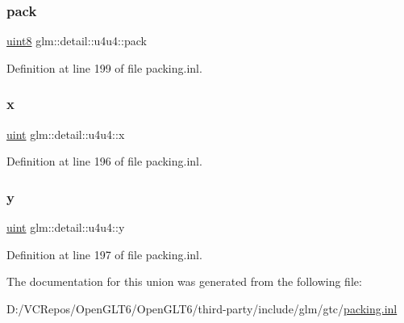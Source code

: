 \mbox{\label{unionglm_1_1detail_1_1u4u4_a823a2e3d7ae6e4710c0ceb40e191ef7b}} 
\subsubsection{\texorpdfstring{pack}{pack}}
{\footnotesize\ttfamily \mbox{\hyperlink{namespaceglm_1_1detail_aef2588f97d090cc19fbbe0c74fe17c8f}{uint8}} glm\+::detail\+::u4u4\+::pack}



Definition at line 199 of file packing.\+inl.

\mbox{\label{unionglm_1_1detail_1_1u4u4_a488b94e524db2319dd7801ef632ef7f1}} 
\subsubsection{\texorpdfstring{x}{x}}
{\footnotesize\ttfamily \mbox{\hyperlink{group__core__precision_ga4fd29415871152bfb5abd588334147c8}{uint}} glm\+::detail\+::u4u4\+::x}



Definition at line 196 of file packing.\+inl.

\mbox{\label{unionglm_1_1detail_1_1u4u4_a397ae8c3903b0fd4fe9c88617607f7af}} 
\subsubsection{\texorpdfstring{y}{y}}
{\footnotesize\ttfamily \mbox{\hyperlink{group__core__precision_ga4fd29415871152bfb5abd588334147c8}{uint}} glm\+::detail\+::u4u4\+::y}



Definition at line 197 of file packing.\+inl.



The documentation for this union was generated from the following file\+:\begin{DoxyCompactItemize}
\item 
D\+:/\+V\+C\+Repos/\+Open\+G\+L\+T6/\+Open\+G\+L\+T6/third-\/party/include/glm/gtc/\mbox{\hyperlink{packing_8inl}{packing.\+inl}}\end{DoxyCompactItemize}
